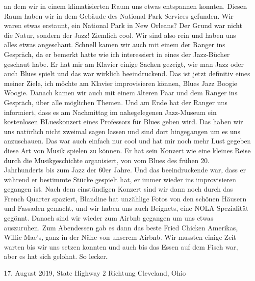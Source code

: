 \documentclass[11pt]{book}
\begin{document}
an dem wir in einem klimatisierten Raum uns etwas entspannen konnten. Diesen Raum haben wir in dem Gebäude des National Park Services gefunden. Wir waren etwas 
erstaunt, ein National Park in New Orleans? Der Grund war nicht die Natur, sondern der Jazz! Ziemlich cool. Wir sind also rein und haben uns alles etwas 
angeschaut. Schnell kamen wir auch mit einem der Ranger ins Gespräch, da er bemerkt hatte wie ich interessiert in eines der Jazz-Bücher geschaut habe. Er hat mir 
am Klavier einige Sachen gezeigt, wie man Jazz oder auch Blues spielt und das war wirklich beeindruckend. Das ist jetzt definitiv eines meiner Ziele, ich möchte 
am Klavier improvisieren können, Blues Jazz Boogie Woogie. Danach kamen wir auch mit einem älteren Paar und dem Ranger ins Gespräch, über alle möglichen Themen. 
Und am Ende hat der Ranger uns informiert, dass es am Nachmittag im nahegelegenen Jazz-Museum ein kostenlosen BLueskonzert eines Professors für Blues geben wird. 
Das haben wir uns natürlich nicht zweimal sagen lassen und sind dort hingegangen um es uns anzuschauen. Das war auch einfach nur cool und hat mir noch mehr 
Lust gegeben diese Art von Musik spielen zu können. Er hat sein Konzert wie eine kleines Reise durch die Musikgeschichte organisiert, von vom Blues des frühen 
20. Jahrhunderts bis zum Jazz der 60er Jahre. Und das beeindruckende war, dass er während er bestimmte Stücke gespielt hat, er immer wieder ins improvisieren 
gegangen ist. Nach dem einstündigen Konzert sind wir dann noch durch das French Quarter spaziert, Blandine hat unzählige Fotos von den schönen Häusern und Fassaden 
gemacht, und wir haben uns auch Beignets, eine NOLA Spezialität gegönnt. Danach sind wir wieder zum Airbnb gegangen um uns etwas auszuruhen. Zum Abendessen 
gab es dann das beste Fried Chicken Amerikas, Willie Mae's, ganz in der Nähe von unserem Airbnb. Wir mussten einige Zeit warten bis wir uns setzen konnten und auch 
bis das Essen auf dem Fisch war, aber es hat sich gelohnt. So lecker. 






17. August 2019, State Highway 2 Richtung Cleveland, Ohio
\end{document}
